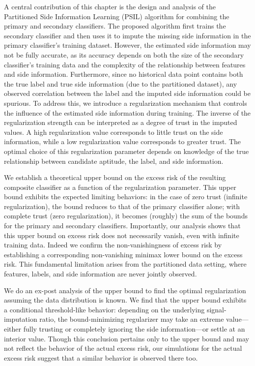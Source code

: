 A central contribution of this chapter is the design and analysis of the Partitioned Side Information Learning (PSIL) algorithm for combining the primary and secondary classifiers. The proposed algorithm first trains the secondary classifier and then uses it to impute the missing side information in the primary classifier’s training dataset. However, the estimated side information may not be fully accurate, as its accuracy depends on both the size of the secondary classifier’s training data and the complexity of the relationship between features and side information. Furthermore, since no historical data point contains both the true label and true side information (due to the partitioned dataset), any observed correlation between the label and the imputed side information could be spurious. To address this, we introduce a regularization mechanism that controls the influence of the estimated side information during training. The inverse of the regularization strength can be interpreted as a degree of trust in the imputed values. A high regularization value corresponds to little trust on the side information, while a low regularization value corresponds to greater trust. The optimal choice of this regularization parameter depends on knowledge of the true relationship between candidate aptitude, the label, and side information.

We establish a theoretical upper bound on the excess risk of the resulting composite classifier as a function of the regularization parameter. This upper bound exhibits the expected limiting behaviors: in the case of zero trust (infinite regularization), the bound reduces to that of the primary classifier alone; with complete trust (zero regularization), it becomes (roughly) the sum of the bounds for the primary and secondary classifiers. Importantly, our analysis shows that this upper bound on excess risk does not necessarily vanish, even with infinite training data. Indeed we confirm the non-vanishingness of excess risk by establishing a corresponding non-vanishing minimax lower bound on the excess risk. This fundamental limitation arises from the partitioned data setting, where features, labels, and side information are never jointly observed.


We do an ex-post analysis of the upper bound to find the optimal regularization assuming the data distribution is known. We find that the upper bound exhibits a conditional threshold-like behavior: depending on the underlying signal-imputation ratio, the bound-minimizing regularizer may take an extreme value—either fully trusting or completely ignoring the side information—or settle at an interior value. Though this conclusion pertains only to the upper bound and may not reflect the behavior of the actual excess risk, our simulations for the actual excess risk suggest that a similar behavior is observed there too.


